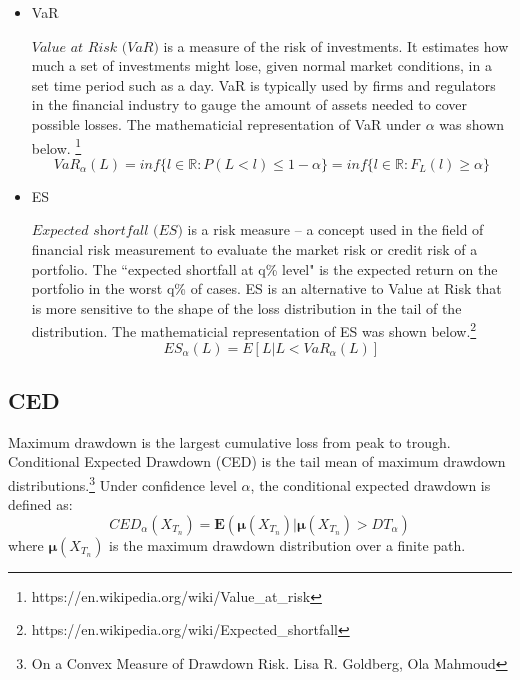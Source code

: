 \documentclass[12pt]{article}
\begin{document}
\begin{itemize}
\item VaR

$\textit{Value at Risk (VaR)} $  is a measure of the risk of investments. It estimates how much a set of investments might lose, given normal market conditions, in a set time period such as a day. VaR is typically used by firms and regulators in the financial industry to gauge the amount of assets needed to cover possible losses. The mathematicial representation of VaR under $\alpha$ was shown below. \footnote{https://en.wikipedia.org/wiki/Value\_at\_risk}
\begin{equation}
VaR_{\alpha}(L) = inf\{l \in \mathbb{R} : P(L < l) \leq 1-\alpha \} = 
inf\{l \in \mathbb{R} : F_L(l) \geq \alpha \}
\end{equation}
\item ES

$\textit{Expected shortfall (ES)}$ is a risk measure -- a concept used in the field of financial risk measurement to evaluate the market risk or credit risk of a portfolio. The ``expected shortfall at q\% level" is the expected return on the portfolio in the worst q\% of cases. ES is an alternative to Value at Risk that is more sensitive to the shape of the loss distribution in the tail of the distribution. The mathematicial representation of ES was shown below.\footnote{https://en.wikipedia.org/wiki/Expected\_shortfall}
\begin{equation}
ES_{\alpha}(L) = E\left[ L \vert L<VaR_{\alpha}(L) \right]
\end{equation}

\end{itemize}



\subsection{CED}

Maximum drawdown is the largest cumulative loss from peak to trough. Conditional Expected Drawdown (CED) is the tail mean of maximum drawdown distributions.\footnote{On a Convex Measure of Drawdown Risk. Lisa R. Goldberg, Ola Mahmoud} Under confidence level $\alpha$, the conditional expected drawdown is defined as:
\begin{equation}
CED_\alpha(X_{T_n}) = \textbf{E}(\mathbf{\mu}(X_{T_n})|\mathbf{\mu}(X_{T_n}) > DT_\alpha)
\end{equation}
where $\mathbf{\mu}(X_{T_n})$ is the maximum drawdown distribution over a finite path.
\end{document}
